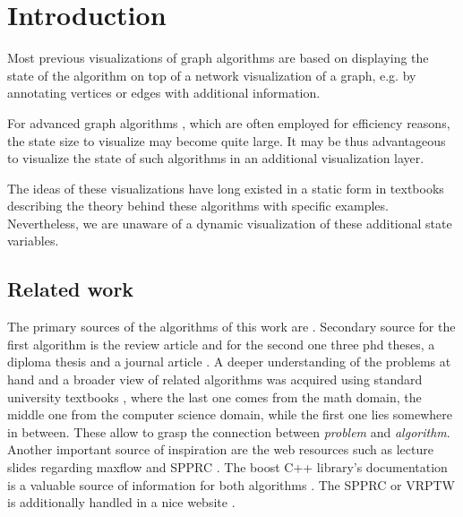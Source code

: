 \chapter{Introduction}\label{ch:1}

Most previous visualizations of graph algorithms \cite{storz2013idp,velden2014idp,sefidgar2015idp,becker2015idp,zoennchen2015idp,fischer2016idp,feil2016idp} are based on displaying the state of the algorithm on top of a network visualization of a graph, e.g. by annotating vertices or edges with additional information.

For advanced graph algorithms \cite{goldberg1988new,irnich2005shortest}, which are often employed for efficiency reasons, the state size to visualize may become quite large. It may be thus advantageous to visualize the state of such algorithms in an additional visualization layer. 

The ideas of these visualizations have long existed in a static form in textbooks describing the theory behind these algorithms with specific examples. Nevertheless, we are unaware of a dynamic visualization of these additional state variables.

\section{Related work}
The primary sources of the algorithms of this work are \cite{goldberg1988new,irnich2005shortest}. Secondary source for the first algorithm is the review article \cite{goldberg2014efficient} and for the second one three phd theses, a diploma thesis and a journal article \cite{solomon1983vehicle,ziegelmann2001constrained,schlechte2003resource,feillet2004exact,garcia2009resource}.
A deeper understanding of the problems at hand and a broader view of related algorithms was acquired using standard university textbooks \cite{ahuja1993network,cormen2009introduction,jungnickel2013graphs}, where the last one comes from the math domain, the middle one from the computer science domain, while the first one lies somewhere in between. These allow to grasp the connection between \textit{problem} and \textit{algorithm}.
Another important source of inspiration are the web resources such as lecture slides regarding maxflow \cite{mayer2013prakt,mehlhorn2000maximum,williamson2007network,matuschke2016network} and SPPRC \cite{petersen2006label}. The boost C++ library's documentation is a valuable source of information for both algorithms \cite{boost2002push,boost2006rc}. The SPPRC or VRPTW is additionally handled in a nice website \cite{networking2013vehicle}.

